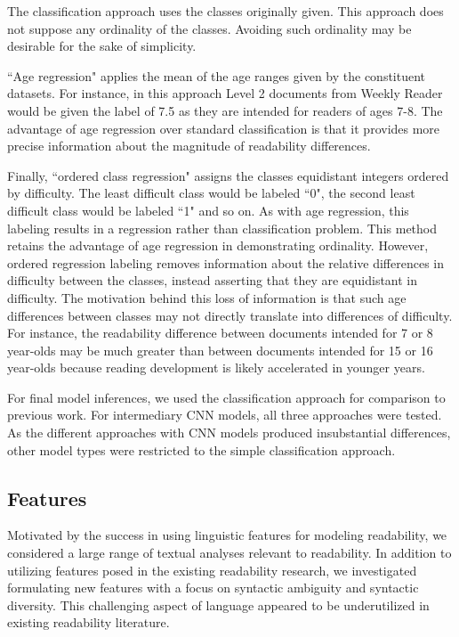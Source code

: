 \documentclass[11pt,a4paper]{article}
\theoremstyle{definition}
\begin{document}
The classification approach uses the classes originally given. This approach does not suppose any ordinality of the classes. Avoiding such ordinality may be desirable for the sake of simplicity. 

``Age regression" applies the mean of the age ranges given by the constituent datasets. For instance, in this approach Level 2 documents from Weekly Reader would be given the label of 7.5 as they are intended for readers of ages 7-8. The advantage of age regression over standard classification is that it provides more precise information about the magnitude of readability differences. 

Finally, ``ordered class regression" assigns the classes equidistant integers ordered by difficulty. The least difficult class would be labeled ``0", the second least difficult class would be labeled ``1" and so on. As with age regression, this labeling results in a regression rather than classification problem. This method retains the advantage of age regression in demonstrating ordinality. However, ordered regression labeling removes information about the relative differences in difficulty between the classes, instead asserting that they are equidistant in difficulty. The motivation behind this loss of information is that such age differences between classes may not directly translate into differences of difficulty. For instance, the readability difference between documents intended for 7 or 8 year-olds may be much greater than between documents intended for 15 or 16 year-olds because reading development is likely accelerated in younger years.

For final model inferences, we used the classification approach for comparison to previous work. For intermediary CNN models, all three approaches were tested. As the different approaches with CNN models produced insubstantial differences, other model types were restricted to the simple classification approach.

\subsection{Features}
\label{sec:methodLingFeatures}
Motivated by the success in using linguistic features for modeling readability, we considered a large range of textual analyses relevant to readability. In addition to utilizing features posed in the existing readability research, we investigated formulating new features with a focus on syntactic ambiguity and syntactic diversity. This challenging aspect of language appeared to be underutilized in existing readability literature.
\end{document}
